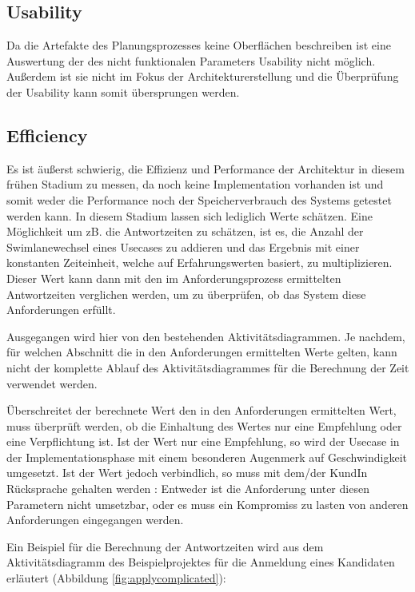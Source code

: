\subsection{Usability}
Da die Artefakte des Planungsprozesses keine Oberflächen beschreiben ist eine Auswertung der des nicht funktionalen Parameters Usability nicht möglich. Außerdem ist sie nicht im Fokus der Architekturerstellung und die Überprüfung der Usability kann somit übersprungen werden.

\subsection{Efficiency}
Es ist äußerst schwierig, die Effizienz und Performance der Architektur in diesem frühen Stadium zu messen, da noch keine Implementation vorhanden ist und somit weder die Performance noch der Speicherverbrauch des Systems getestet werden kann. In diesem Stadium lassen sich lediglich Werte schätzen. Eine Möglichkeit um zB. die Antwortzeiten zu schätzen, ist es, die Anzahl der Swimlanewechsel eines Usecases zu addieren und das Ergebnis mit einer konstanten Zeiteinheit, welche auf Erfahrungswerten basiert, zu multiplizieren. Dieser Wert kann dann mit den im Anforderungsprozess ermittelten Antwortzeiten verglichen werden, um zu überprüfen, ob das System diese Anforderungen erfüllt.

Ausgegangen wird hier von den bestehenden Aktivitätsdiagrammen. Je nachdem, für welchen Abschnitt die in den Anforderungen ermittelten Werte gelten, kann nicht der komplette Ablauf des Aktivitätsdiagrammes für die Berechnung der Zeit verwendet werden.

Überschreitet der berechnete Wert den in den Anforderungen ermittelten Wert, muss überprüft werden, ob die Einhaltung des Wertes nur eine Empfehlung oder eine Verpflichtung ist. Ist der Wert nur eine Empfehlung, so wird der Usecase in der Implementationsphase mit einem besonderen Augenmerk auf Geschwindigkeit umgesetzt. Ist der Wert jedoch verbindlich, so muss mit dem/der KundIn Rücksprache gehalten werden \cite[S. 70]{effektiv}: Entweder ist die Anforderung unter diesen Parametern nicht umsetzbar, oder es muss ein Kompromiss zu lasten von anderen Anforderungen eingegangen werden.

Ein Beispiel für die Berechnung der Antwortzeiten wird aus dem Aktivitätsdiagramm des Beispielprojektes für die Anmeldung eines Kandidaten erläutert (Abbildung \ref{fig:applycomplicated}):

